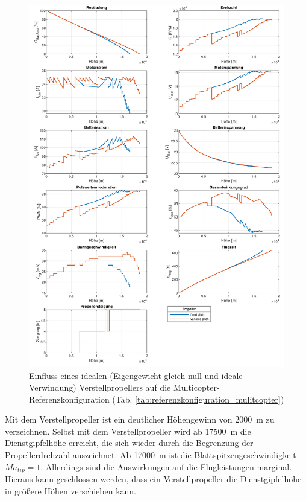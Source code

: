 \begin{figure}[H]
\centering
	\includegraphics[scale=0.7]{Diagramme/Verstellpropeller.pdf}
	\caption{Einfluss eines idealen (Eigengewicht gleich null und ideale Verwindung) Verstellpropellers auf die Multicopter-Referenzkonfiguration (Tab. \ref{tab:referenzkonfiguration_mulitcopter})}
	\label{abb:verstellpropeller}
\end{figure}
Mit dem Verstellpropeller ist ein deutlicher Höhengewinn von \SI{2000}{m} zu verzeichnen. Selbst mit dem Verstellpropeller wird ab \SI{17500}{m} die Dienstgipfelhöhe erreicht, die sich wieder durch die Begrenzung der Propellerdrehzahl auszeichnet. Ab \SI{17000}{m} ist die Blattspitzengeschwindigkeit  \ensuremath{Ma_{tip} = 1}. Allerdings sind die Auswirkungen auf die Flugleistungen marginal. Hieraus kann geschlossen werden, dass ein Verstellpropeller die Dienstgipfelhöhe in größere Höhen verschieben kann. \\

